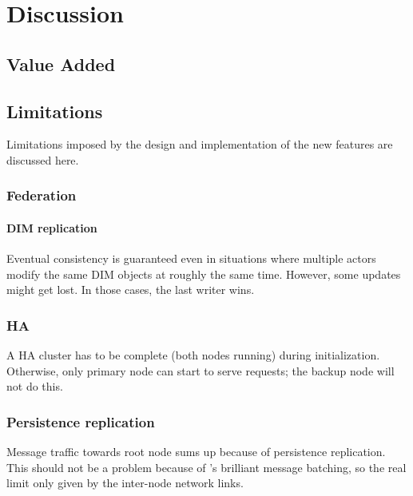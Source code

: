 \chapter{Discussion}

\section{Value Added}

\section{Limitations}
Limitations imposed by the design and implementation of the new features are
discussed here.

\subsection{Federation}
\subsubsection{DIM replication}
Eventual consistency is guaranteed even in situations where multiple actors
modify the same DIM objects at roughly the same time. However, some updates
might get lost. In those cases, the last writer wins.

\subsection{HA}
A HA cluster has to be complete (both nodes running) during initialization.
Otherwise, only primary node can start to serve requests; the backup node will not
do this.

\subsection{Persistence replication}
Message traffic towards root node sums up because of persistence
replication. This should not be a problem because of \zmq's brilliant
message batching, so the real limit only given by the inter-node network links.


